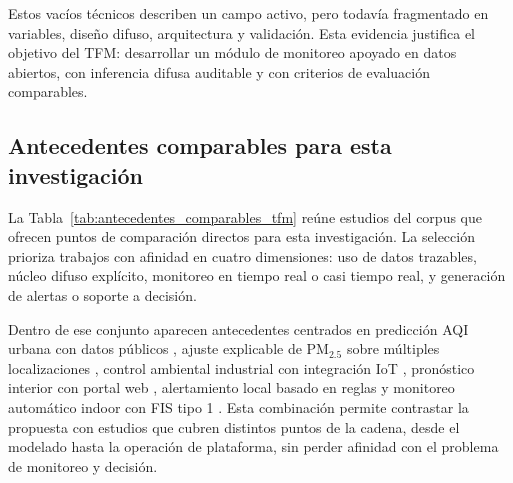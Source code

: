 Estos vacíos técnicos describen un campo activo, pero todavía fragmentado en variables, diseño difuso, arquitectura y validación. Esta evidencia justifica el objetivo del TFM: desarrollar un módulo de monitoreo apoyado en datos abiertos, con inferencia difusa auditable y con criterios de evaluación comparables.

\subsection{Antecedentes comparables para esta investigación}
La Tabla~\ref{tab:antecedentes_comparables_tfm} reúne estudios del corpus que ofrecen puntos de comparación directos para esta investigación. La selección prioriza trabajos con afinidad en cuatro dimensiones: uso de datos trazables, núcleo difuso explícito, monitoreo en tiempo real o casi tiempo real, y generación de alertas o soporte a decisión.

Dentro de ese conjunto aparecen antecedentes centrados en predicción AQI urbana con datos públicos \cite{A028}, ajuste explicable de PM$_{2.5}$ sobre múltiples localizaciones \cite{A084}, control ambiental industrial con integración IoT \cite{A114}, pronóstico interior con portal web \cite{A135}, alertamiento local basado en reglas \cite{A165} y monitoreo automático indoor con FIS tipo 1 \cite{A167}. Esta combinación permite contrastar la propuesta con estudios que cubren distintos puntos de la cadena, desde el modelado hasta la operación de plataforma, sin perder afinidad con el problema de monitoreo y decisión.



